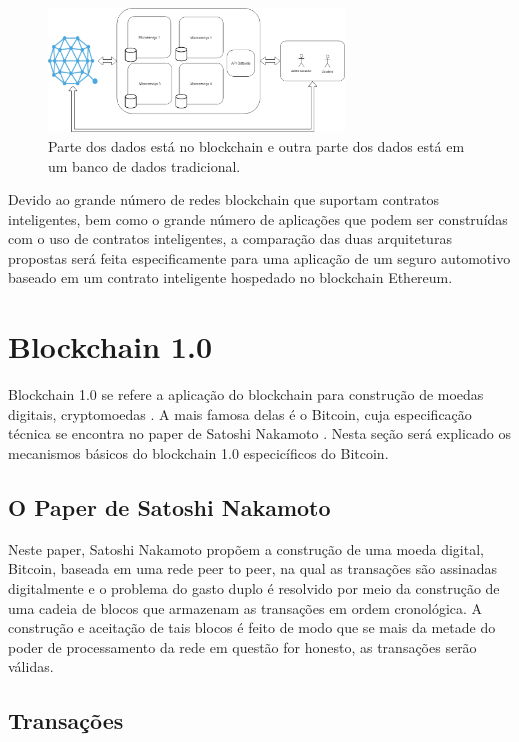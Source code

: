 \begin{figure}[ht]
\centering
\includegraphics[width=0.7\textwidth]{Cap1/arquitetura_2_generica}
\caption{Parte dos dados está no blockchain e outra parte dos dados está em um banco de dados tradicional.}
\label{arquitetura_2_generica}
\end{figure}

Devido ao grande número de redes blockchain que suportam contratos inteligentes, bem como o grande número de aplicações que podem ser construídas com o uso de contratos inteligentes, a comparação das duas arquiteturas propostas será feita especificamente para uma aplicação de um seguro automotivo baseado em um contrato inteligente hospedado no blockchain Ethereum.

\section{Blockchain 1.0}

Blockchain 1.0 se refere a aplicação do blockchain para construção de moedas digitais, cryptomoedas \cite{blockchainneweconomy}. A mais famosa delas é o Bitcoin, cuja especificação técnica se encontra no paper de Satoshi Nakamoto \cite{paper_satoshi}. Nesta seção será explicado os mecanismos básicos do blockchain 1.0 especicíficos do Bitcoin.

\subsection{O Paper de Satoshi Nakamoto}

Neste paper, Satoshi Nakamoto propõem a construção de uma moeda digital, Bitcoin, baseada em uma rede peer to peer, na qual as transações são assinadas digitalmente e o problema do gasto duplo é resolvido por meio da construção de uma cadeia de blocos que armazenam as transações em ordem cronológica. A construção e aceitação de tais blocos é feito de modo que se mais da metade do poder de processamento da rede em questão for honesto, as transações serão válidas.

\subsection{Transações}

